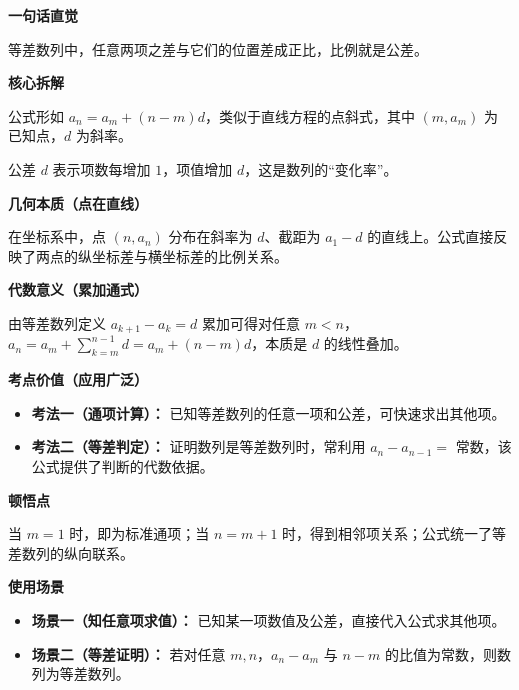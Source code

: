 \begin{explanationbox}
	\textbf{\textcolor{CExplanation}{一句话直觉}}

	等差数列中，任意两项之差与它们的位置差成正比，比例就是公差。

	\medskip
	\textbf{\textcolor{CExplanation}{核心拆解}}
	\begin{description}[style=nextline, leftmargin=2.8em, labelsep=0.5em, itemsep=0.45em]
		\item[\textbf{要点一（结构类比）：}] 公式形如 \(a_n = a_m + (n-m)d\)，类似于直线方程的点斜式，其中 \((m, a_m)\) 为已知点，\(d\) 为斜率。
		\item[\textbf{要点二（公差角色）：}] 公差 \(d\) 表示项数每增加 $1$，项值增加 $d$，这是数列的“变化率”。
	\end{description}

	\medskip
	\textbf{\textcolor{CExplanation}{几何本质（点在直线）}}

	在坐标系中，点 \((n, a_n)\) 分布在斜率为 \(d\)、截距为 \(a_1 - d\) 的直线上。公式直接反映了两点的纵坐标差与横坐标差的比例关系。

	\medskip
	\textbf{\textcolor{CExplanation}{代数意义（累加通式）}}

	由等差数列定义 \(a_{k+1} - a_k = d\) 累加可得对任意 \(m<n\)，\(a_n = a_m + \sum_{k=m}^{n-1} d = a_m + (n-m)d\)，本质是 \(d\) 的线性叠加。

	\medskip
	\textbf{\textcolor{CExplanation}{考点价值（应用广泛）}}
	\begin{itemize}[leftmargin=*, itemsep=0.5em, topsep=0.4em]
		\item \textbf{考法一（通项计算）：} 已知等差数列的任意一项和公差，可快速求出其他项。
		\item \textbf{考法二（等差判定）：} 证明数列是等差数列时，常利用 \(a_n - a_{n-1} =\) 常数，该公式提供了判断的代数依据。
	\end{itemize}

	\medskip
	\textbf{\textcolor{CExplanation}{顿悟点}}

	当 \(m=1\) 时，即为标准通项；当 \(n=m+1\) 时，得到相邻项关系；公式统一了等差数列的纵向联系。

	\medskip
	\textbf{\textcolor{CExplanation}{使用场景}}
	\begin{itemize}[leftmargin=*, itemsep=0.5em, topsep=0.4em]
		\item \textbf{场景一（知任意项求值）：} 已知某一项数值及公差，直接代入公式求其他项。
		\item \textbf{场景二（等差证明）：} 若对任意 \(m,n\)，\(a_n - a_m\) 与 \(n-m\) 的比值为常数，则数列为等差数列。
	\end{itemize}
\end{explanationbox}